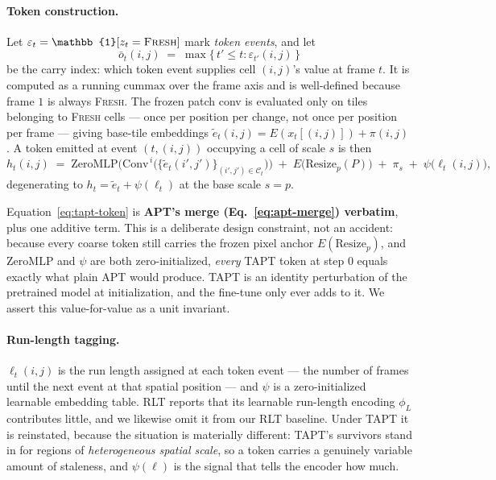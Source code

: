 \paragraph{Token construction.}
\label{sec:tapt-token}
Let $\varepsilon_t = \mathbb{1}[z_t = \textsc{Fresh}]$ mark \emph{token events},
and let
\begin{equation}
  \bar{o}_t(i,j) \;=\; \max\{\,t' \le t : \varepsilon_{t'}(i,j)\,\}
\end{equation}
be the carry index: which token event supplies cell $(i,j)$'s value at frame $t$.
It is computed as a running $\mathrm{cummax}$ over the frame axis and is
well-defined because frame $1$ is always \textsc{Fresh}. The frozen patch conv is
evaluated only on tiles belonging to \textsc{Fresh} cells --- once per position
per change, not once per position per frame --- giving base-tile embeddings
$\tilde{e}_t(i,j) = E(x_t[(i,j)]) + \pi(i,j)$. A token emitted at event
$(t,(i,j))$ occupying a cell of scale $s$ is then
\begin{equation}
  \label{eq:tapt-token}
  h_t(i,j) \;=\;
  \mathrm{ZeroMLP}\Big(\mathrm{Conv}^{\,i}\big(\{\tilde{e}_t(i',j')\}_{(i',j') \in \mathcal{C}_t}\big)\Big)
  \;+\; E\big(\mathrm{Resize}_p(P)\big)
  \;+\; \pi_s
  \;+\; \psi\big(\ell_t(i,j)\big),
\end{equation}
degenerating to $h_t = \tilde{e}_t + \psi(\ell_t)$ at the base scale $s=p$.

Equation~\ref{eq:tapt-token} is \textbf{APT's merge (Eq.~\ref{eq:apt-merge})
verbatim}, plus one additive term. This is a deliberate design constraint, not an
accident: because every coarse token still carries the frozen pixel anchor
$E(\mathrm{Resize}_p)$, and $\mathrm{ZeroMLP}$ and $\psi$ are both
zero-initialized, \emph{every} TAPT token at step $0$ equals exactly what plain
APT would produce. TAPT is an identity perturbation of the pretrained model at
initialization, and the fine-tune only ever adds to it. We assert this
value-for-value as a unit invariant.

\paragraph{Run-length tagging.}
$\ell_t(i,j)$ is the run length assigned at each token event --- the number of
frames until the next event at that spatial position --- and $\psi$ is a
zero-initialized learnable embedding table. RLT reports that its learnable
run-length encoding $\phi_L$ contributes little, and we likewise omit it from our
RLT baseline. Under TAPT it is reinstated, because the situation is materially
different: TAPT's survivors stand in for regions of \emph{heterogeneous spatial
scale}, so a token carries a genuinely variable amount of staleness, and
$\psi(\ell)$ is the signal that tells the encoder how much.

